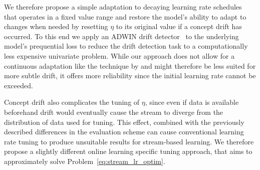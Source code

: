 \documentclass[letterpaper]{article} %
\begin{document}

We therefore propose a simple adaptation to decaying learning rate schedules that operates in a fixed value range and restore the model's ability to adapt to changes when needed by resetting $\eta$ to its original value if a concept drift has occurred.
To this end we apply an ADWIN drift detector~\cite{bifetLearningTimeChangingData2007} to the underlying model's prequential loss to reduce the drift detection task to a computationally less expensive univariate problem.
While our approach does not allow for a continuous adaptation like the technique by \citet{kunchevaAdaptiveLearningRate2008} and might therefore be less suited for more subtle drift, it offers more reliability since the initial learning rate cannot be exceeded.

Concept drift also complicates the tuning of $\eta$, since even if data is available beforehand drift would eventually cause the stream to diverge from the distribution of data used for tuning.
This effect, combined with the previously described differences in the evaluation scheme can cause conventional learning rate tuning to produce unsuitable results for stream-based learning.
We therefore propose a slightly different online learning specific tuning approach, that aims to approximately solve Problem~\ref{eq:stream_lr_optim}.
\end{document}
